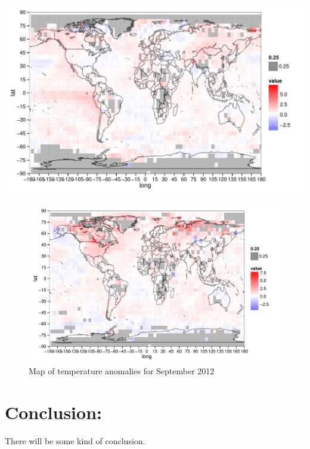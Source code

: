 \documentclass{article}\usepackage{graphicx, color}
\newenvironment{knitrout}{}{} %
\begin{document}
\begin{knitrout}
\color{fgcolor}\includegraphics[width=\linewidth]{figure/1997-map} 
\end{knitrout}



\begin{figure}[!h]
\begin{knitrout}
\color{fgcolor}\includegraphics[width=\linewidth]{figure/recent-map} 
\end{knitrout}

\caption{\label{sep2012map}Map of temperature anomalies for September 2012}
\end{figure}

\section{Conclusion:}
There will be some kind of conclusion.
\end{document}
